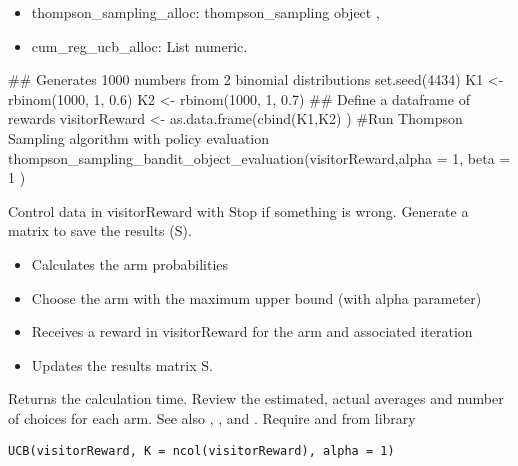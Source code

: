 \documentclass[letterpaper]{book}
\begin{document}
%
\begin{Value}
\begin{itemize}
 List of element:
\item thompson\_sampling\_alloc: thompson\_sampling object ,
\item cum\_reg\_ucb\_alloc: List numeric.

\end{itemize}

\end{Value}
%
\begin{Examples}
\begin{ExampleCode}
## Generates 1000 numbers from 2 binomial distributions
set.seed(4434)
K1 <- rbinom(1000, 1, 0.6)
K2 <- rbinom(1000, 1, 0.7)
## Define a dataframe of rewards
visitorReward <- as.data.frame(cbind(K1,K2) )
#Run Thompson Sampling algorithm with policy evaluation
thompson_sampling_bandit_object_evaluation(visitorReward,alpha = 1, beta = 1 )

\end{ExampleCode}
\end{Examples}
%
\begin{Description}\relax
Control data in visitorReward with 
Stop if something is wrong.
Generate a matrix to save the results (S).
\begin{itemize}
 At each iteration
\item Calculates the arm probabilities
\item Choose the arm with the maximum upper bound (with alpha parameter)
\item Receives a reward in visitorReward for the arm and associated iteration
\item Updates the results matrix S.

\end{itemize}

Returns the calculation time.
Review the estimated, actual averages and number of choices for each arm.
See also , ,
 and .
Require  and  from  library
\end{Description}
%
\begin{Usage}
\begin{verbatim}
UCB(visitorReward, K = ncol(visitorReward), alpha = 1)
\end{verbatim}
\end{Usage}
\end{document}
